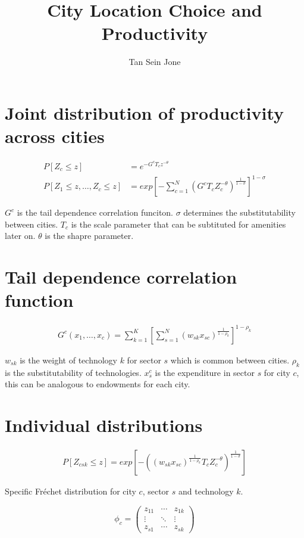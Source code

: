 \documentclass[10pt]{article}
\title{City Location Choice and Productivity}
\author{Tan Sein Jone}
\date{}
\begin{document}
\doublespacing
\maketitle

\section{Joint distribution of productivity across cities}

\begin{align}
    P[Z_c \leq z]                    & = e^{-G^c T_c z^{-\theta}}                                                            \\
    P[Z_1 \leq z, \dots, Z_c \leq z] & = exp[-\sum_{c = 1}^{N}(G^c T_c Z_{c}^{-\theta})^{\frac{1}{1 - \sigma}}]^{1 - \sigma}
\end{align}

$G^c$ is the tail dependence correlation funciton. $\sigma$ determines the substitutability between cities. $T_c$ is the scale parameter that can be subtituted for amenities later on. $\theta$ is the shapre parameter.

\section{Tail dependence correlation function}

\begin{align}
    G^c(x_1, \dots, x_c) = \sum_{k = 1}^{K}[\sum_{s = 1}^{N}(w_{sk}x_{sc})^{\frac{1}{1 - \rho_k}}]^{1 - \rho_k}
\end{align}

$w_{sk}$ is the weight of technology $k$ for sector $s$ which is common between cities. $\rho_k$ is the substitutability of technologies. $x_{s}^{c}$ is the expenditure in sector $s$ for city $c$, this can be analogous to endowments for each city.

\section{Individual distributions}

\begin{align}
    P[Z_{csk} \leq z] = exp [-((w_{sk} x_{sc})^{\frac{1}{1 - \rho_k}} T_c Z_{c}^{-\theta})^{\frac{1}{1 - \sigma}}]
\end{align}

Specific Fréchet distribution for city $c$, sector $s$ and technology $k$.

\begin{equation}
    \phi_c =
    \begin{pmatrix}
        z_{11} & \cdots & z_{1k} \\
        \vdots & \ddots & \vdots \\
        z_{s1} & \cdots & z_{sk}
    \end{pmatrix}
\end{equation}
\end{document}
